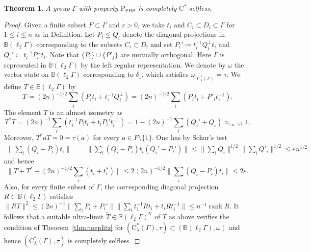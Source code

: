 \documentclass[12pt,nosumlimits,nonamelimits]{amsart}
\newtheorem{thm}{Theorem}
\theoremstyle{remark}
\theoremstyle{definition}
\newcommand{\IB}{\mathbb{B}}
\newcommand{\cU}{\mathcal{U}}
\newcommand{\ve}{\varepsilon}
\newcommand{\Ga}{\Gamma}
\DeclareMathOperator{\rank}{rank}
\begin{document}
\begin{thm}
A group $\Ga$ with property $\mathrm{P}_{\mathrm{PHP}}$ is completely $\mathrm{C}^*$-selfless. 
\end{thm}
\begin{proof}
Given a finite subset $F\subset\Ga$ and $\ve>0$,  
we take $t_i$ and $C_i\subset D_i\subset\Ga$ for $1\le i \le n$ 
as in Definition.
Let $P_i \le Q_i$ denote the diagonal projections 
in $\IB(\ell_2\Ga)$ corresponding to the subsets $C_i\subset D_i$ and 
set $P_i' \coloneq t_i^{-1}Q_i^\perp t_i$ and 
$Q_i' \coloneq t_i^{-1}P_i^\perp t_i$.
Note that $\{ P_i \}\cup\{ P'_j\}$ are mutually orthogonal. 
Here $\Ga$ is represented in $\IB(\ell_2\Ga)$ 
by the left regular representation. 
We denote by $\omega$ the vector state on $\IB(\ell_2\Ga)$ 
corresponding to $\delta_1$, 
which satisfies $\omega|_{\mathrm{C}^*_\lambda(\Ga)}=\tau$. 
We define $T\in\IB(\ell_2\Ga)$ by 
\[
T\coloneq (2n)^{-1/2}\sum_i (P_i t_i + t_i^{-1} Q_i^\perp)
= (2n)^{-1/2}\sum_i (P_i t_i + P'_i t_i^{-1} ).
\]
The element $T$ is an almost isometry as
\[
T^*T
 = (2n)^{-1} \sum_i (t_i^{-1}P_i t_i  + t_i P_i' t_i^{-1})
 = 1-(2n)^{-1}\sum_i (Q_i'+Q_i)
 \approx_{\ve n^{-1/2}} 1.
\]
Moreover, $T^*aT = 0 = \tau(a)$ for every $a\in F\setminus\{1\}$. 
One has by Schur's test
\begin{align*}
\| \sum_i (Q_i-P_i)t_i \| 
 &= \| \sum_i (Q_i-P_i)t_i(Q_i'-P_i') \| 
 \le \|\sum_i Q_i\|^{1/2}\|\sum_i Q'_i\|^{1/2}
 \le\ve n^{1/2}
\end{align*}
and hence 
\[
\| T+T^* - (2n)^{-1/2}\sum_i (t_i+t_i^*) \|
 \le 2(2n)^{-1/2}\| \sum_i (Q_i-P_i)t_i \|
 \le 2\ve.
\]
Also, for every finite subset of $\Ga$, the corresponding 
diagonal projection $R\in\IB(\ell_2\Ga)$ satisfies 
$\| RT\|^2 \le (2n)^{-1} \|\sum_i P_i + P_i' \| \|\sum_i t_i^{-1}Rt_i + t_i R t_i^{-1}\| 
\le n^{-1}\rank R$. 
It follows that a suitable ultra-limit $\tilde{T} \in \IB(\ell_2\Ga)^\cU$ 
of $T$ as above verifies the condition 
of Theorem~\ref{thm:toeplitz} 
for $(\mathrm{C}^*_\lambda(\Ga),\tau)\subset(\IB(\ell_2\Ga),\omega)$ 
and hence $(\mathrm{C}^*_\lambda(\Ga),\tau)$ is completely selfless.
\end{proof}
\end{document}
